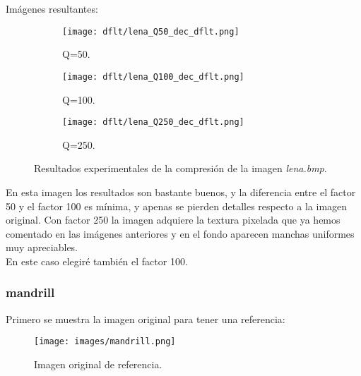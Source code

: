 \documentclass[12pt,a4paper]{article}
\begin{document}
Imágenes resultantes:
\begin{figure}   [H]
    \begin{subfigure}{0.30\textwidth}
        \centering
        \texttt{[image: dflt/lena\_Q50\_dec\_dflt.png]}
        \caption{Q=50.}
        
    \end{subfigure}
    \hfill
    \begin{subfigure}{0.30\textwidth}
        \centering
        \texttt{[image: dflt/lena\_Q100\_dec\_dflt.png]}
        \caption{Q=100.}
        
    \end{subfigure}
    \hfill
    \begin{subfigure}{0.30\textwidth}
        \centering
        \texttt{[image: dflt/lena\_Q250\_dec\_dflt.png]}
        \caption{Q=250.}
        
    \end{subfigure}
    
    \caption[Resultados experimentales - lena]{Resultados experimentales de la compresión de la imagen \textit{lena.bmp}.}
    
\end{figure}

En esta imagen los resultados son bastante buenos, y la diferencia entre el factor 50 y el factor 100 es mínima, y apenas se pierden detalles respecto a la imagen original. Con factor 250 la imagen adquiere la textura pixelada que ya hemos comentado en las imágenes anteriores y en el fondo aparecen manchas uniformes muy apreciables.\\ 

En este caso elegiré también el factor 100.

\subsubsection{mandrill}
Primero se muestra la imagen original para tener una referencia:
\begin{figure}[H]
    \centering
    \texttt{[image: images/mandrill.png]}
    \caption[Referencia - mandrill]{Imagen original de referencia.}
    
\end{figure}
    
    \vspace{0.5cm}
\end{document}
